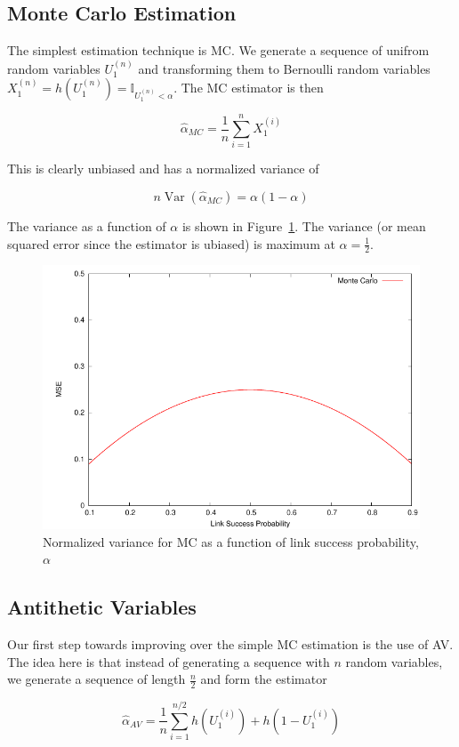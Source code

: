 \documentclass[10pt]{article}
\DeclareMathOperator{\var}{Var}
\begin{document}
\subsection{Monte Carlo Estimation}
The simplest estimation technique is \ac{MC}. We generate a sequence of unifrom random variables $U_{1}^{(n)}$ and transforming them to Bernoulli random variables $X_{1}^{(n)} = h(U_{1}^{(n)}) = \mathbb{I}_{U_{1}^{(n)} < \alpha}$. The \ac{MC} estimator is then

\begin{equation}
\hat{\alpha}_{MC} = \frac{1}{n}\displaystyle\sum_{i=1}^{n}X_{1}^{(i)}
\end{equation}

This is clearly unbiased and has a normalized variance of

\begin{equation}
n\var\left(\hat{\alpha}_{MC}\right) = \alpha(1-\alpha)
\end{equation}

The variance as a function of $\alpha$ is shown in Figure~\ref{fig:mc}. The variance (or mean squared error since the estimator is ubiased) is maximum at $\alpha = \frac{1}{2}$.
\begin{figure}[ht!]
\centering
\includegraphics[width=0.5\columnwidth]{img/monte_carlo}
\caption[Normalized variance for \acs{MC} as a function of link success probability, $\alpha$]{Normalized variance for \acf{MC} as a function of link success probability, $\alpha$}\label{fig:mc}
\end{figure}

\subsection{Antithetic Variables}
Our first step towards improving over the simple \ac{MC} estimation is the use of \ac{AV}\cite{ross-2006}. The idea here is that instead of generating a sequence with $n$ random variables, we generate a sequence of length $\frac{n}{2}$ and form the estimator

\begin{equation}
\hat{\alpha}_{AV} = \frac{1}{n}\displaystyle\sum_{i=1}^{n/2}h(U_{1}^{(i)})+h(1 - U_{1}^{(i)})
\end{equation}
\end{document}
